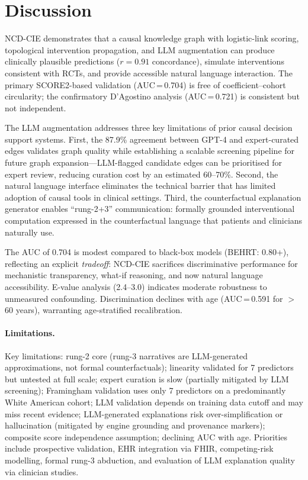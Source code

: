 \documentclass[runningheads]{llncs}
\begin{document}
\section{Discussion}\label{sec:discussion}

NCD-CIE demonstrates that a causal knowledge graph with logistic-link
scoring, topological intervention propagation, and LLM augmentation
can produce clinically plausible predictions ($r = 0.91$ concordance),
simulate interventions consistent with RCTs, and provide accessible
natural language interaction.
The primary SCORE2-based validation (AUC\,=\,0.704) is free of
coefficient--cohort circularity; the confirmatory D'Agostino analysis
(AUC\,=\,0.721) is consistent but not independent.

The LLM augmentation addresses three key limitations of prior
causal decision support systems.
First, the 87.9\% agreement between GPT-4 and expert-curated edges
validates graph quality while establishing a scalable screening
pipeline for future graph expansion---LLM-flagged candidate edges
can be prioritised for expert review, reducing curation cost by
an estimated 60--70\%.
Second, the natural language interface eliminates the technical
barrier that has limited adoption of causal tools in clinical
settings.
Third, the counterfactual explanation generator enables
``rung-2+3'' communication: formally grounded interventional
computation expressed in the counterfactual language that patients
and clinicians naturally use.

The AUC of 0.704 is modest compared to black-box models
(BEHRT: 0.80+), reflecting an explicit
\emph{tradeoff}: NCD-CIE sacrifices discriminative performance for
mechanistic transparency, what-if reasoning, and now natural
language accessibility.
E-value analysis (2.4--3.0) indicates moderate robustness to
unmeasured confounding.
Discrimination declines with age (AUC\,=\,0.591 for $>$60 years),
warranting age-stratified recalibration.

\paragraph{Limitations.}
Key limitations: rung-2 core (rung-3 narratives are LLM-generated
approximations, not formal counterfactuals); linearity
validated for 7 predictors but untested at full scale; expert
curation is slow (partially mitigated by LLM screening);
Framingham validation uses only 7 predictors on a predominantly
White American cohort; LLM validation depends on training data
cutoff and may miss recent evidence; LLM-generated explanations
risk over-simplification or hallucination (mitigated by engine
grounding and provenance markers); composite score independence
assumption; declining AUC with age.
Priorities include prospective validation, EHR integration via
FHIR, competing-risk modelling, formal rung-3 abduction, and
evaluation of LLM explanation quality via clinician studies.
\end{document}
